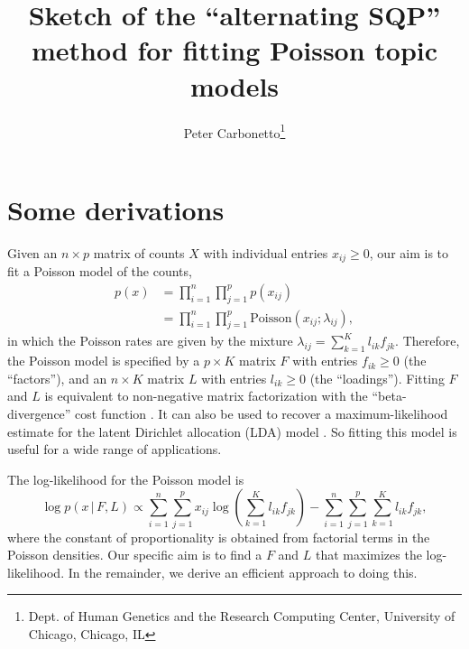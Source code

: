 \documentclass[final]{siamart171218}
\title{Sketch of the ``alternating SQP'' method for fitting Poisson
  topic models}
\author{Peter Carbonetto\thanks{Dept. of Human Genetics and the Research Computing Center, University of Chicago, Chicago, IL}}
\begin{document}
\maketitle

\section{Some derivations}

Given an $n \times p$ matrix of counts $X$ with individual entries
$x_{ij} \geq 0$, our aim is to fit a Poisson model of the counts,
\begin{align}
p(x) &= \prod_{i=1}^n \prod_{j=1}^p p(x_{ij}) \nonumber \\
     &= \prod_{i=1}^n \prod_{j=1}^p \mathrm{Poisson}(x_{ij}; \lambda_{ij}),
\label{eq:poisson-likelihood}
\end{align}
in which the Poisson rates are given by the mixture $\lambda_{ij} =
\sum_{k=1}^K l_{ik} f_{jk}$. Therefore, the Poisson model is specified
by a $p \times K$ matrix $F$ with entries $f_{ik} \geq 0$ (the
``factors''), and an $n \times K$ matrix $L$ with entries $l_{ik} \geq
0$ (the ``loadings''). Fitting $F$ and $L$ is equivalent to
non-negative matrix factorization with the ``beta-divergence'' cost
function \cite{lee-2001}. It can also be used to recover a
maximum-likelihood estimate for the latent Dirichlet allocation (LDA)
model \cite{blei-2003}. So fitting this model is useful for a wide
range of applications.

The log-likelihood for the Poisson model is
\begin{equation}
\log p(x \,|\, F, L) \propto
  \sum_{i=1}^n \sum_{j=1}^p x_{ij} \log
  ({\textstyle \sum_{k=1}^K l_{ik} f_{jk}})
    - \sum_{i=1}^n \sum_{j=1}^p \sum_{k=1}^K l_{ik} f_{jk},
\label{eq:poisson-log-likelihood}
\end{equation}
where the constant of proportionality is obtained from factorial terms
in the Poisson densities. Our specific aim is to find a $F$ and $L$
that maximizes the log-likelihood. In the remainder, we derive an
efficient approach to doing this.



\end{document}
